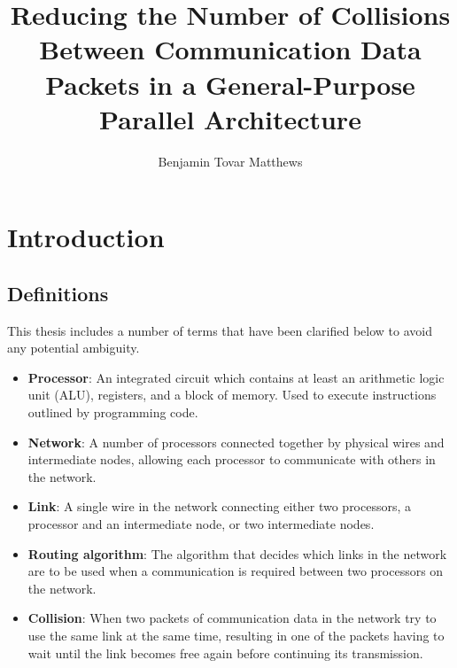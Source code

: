 \documentclass[a4paper, 12pt]{article}
\title{Reducing the Number of Collisions Between Communication Data Packets in a General-Purpose Parallel Architecture}
\author{Benjamin Tovar Matthews}
\begin{document}
\setcounter{page}{0}
\maketitle

\begin{abstract}

\end{abstract}

\thispagestyle{empty}
\newpage
{}
\setcounter{tocdepth}{2}
\tableofcontents
\newpage
\listoffigures

\newpage
\section{Introduction}

\subsection{Definitions}

This thesis includes a number of terms that have been clarified below to avoid any potential ambiguity.
\begin{itemize}[leftmargin=0cm]

\item[] \textbf{Processor}: An integrated circuit which contains at least an arithmetic logic unit (ALU), registers, and a block of memory. Used to execute instructions outlined by programming code.

\item[] \textbf{Network}: A number of processors connected together by physical wires and intermediate nodes, allowing each processor to communicate with others in the network.

\item[] \textbf{Link}: A single wire in the network connecting either two processors, a processor and an intermediate node, or two intermediate nodes.

\item[] \textbf{Routing algorithm}: The algorithm that decides which links in the network are to be used when a communication is required between two processors on the network.

\item[] \textbf{Collision}: When two packets of communication data in the network try to use the same link at the same time, resulting in one of the packets having to wait until the link becomes free again before continuing its transmission.

\end{itemize}
\end{document}
